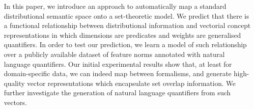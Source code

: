 In this paper, we introduce an approach to automatically map a standard distributional semantic space onto a set-theoretic model. We predict that there is a functional relationship between distributional information  and vectorial concept representations in which dimensions are predicates and weights are generalised quantifiers. In order to test our prediction, we learn a model of such relationship over a publicly available dataset of feature norms annotated with natural language quantifiers.  Our initial experimental results show that, at least for domain-specific data, we can indeed map between formalisms, and generate high-quality vector representations which encapsulate set overlap information. We further investigate the generation of natural language quantifiers from such vectors.
